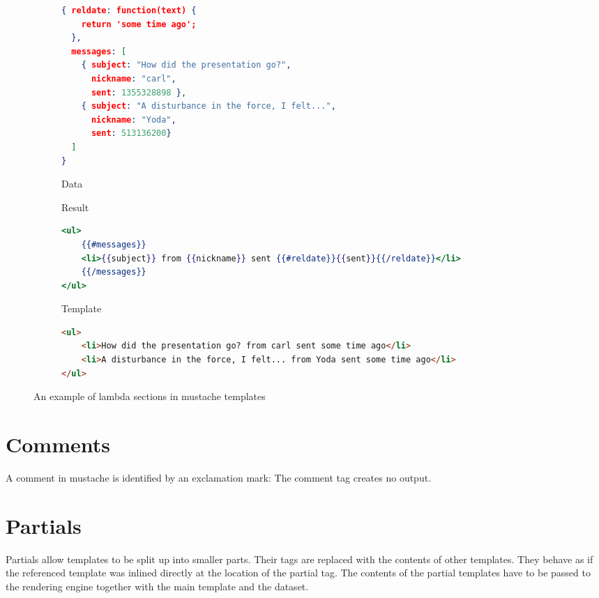 \documentclass[thesis.tex]{subfiles}
\begin{document}
\begin{figure}
	\centering
	\begin{subfigure}{\linewidth}
		\caption{Data}
		\label{fig:lambda-example.data}
		\begin{lstlisting}[language=JSON]
{ reldate: function(text) {
  	return 'some time ago';
  },
  messages: [
  	{ subject: "How did the presentation go?",
  	  nickname: "carl",
  	  sent: 1355328898 },
  	{ subject: "A disturbance in the force, I felt...",
  	  nickname: "Yoda",
  	  sent: 513136200}
  ]
}
		\end{lstlisting}
	\end{subfigure}
	
	\begin{subfigure}{\linewidth}
		\caption{Result}
		\label{fig:lambda-example.html}
		\begin{lstlisting}[language=mustache]
<ul>
	{{#messages}}
	<li>{{subject}} from {{nickname}} sent {{#reldate}}{{sent}}{{/reldate}}</li>
	{{/messages}}
</ul>
		\end{lstlisting}
		\caption{Template}
		\label{fig:lambda-example.mustache}
	\end{subfigure}
	
	\begin{subfigure}{\linewidth}
		\begin{lstlisting}[language=HTML]
<ul>
	<li>How did the presentation go? from carl sent some time ago</li>
	<li>A disturbance in the force, I felt... from Yoda sent some time ago</li>
</ul>
		\end{lstlisting}
	\end{subfigure}
	\caption{An example of lambda sections in mustache templates}
	\label{fig:lambda-example}
\end{figure}

\section{Comments}
A comment in mustache is identified by an exclamation mark:
The comment tag creates no output.

\section{Partials}
\label{sec:mustache-explain-partial}
Partials allow templates to be split up into smaller parts. Their tags are
replaced with the contents of other templates. They behave as if the referenced
template was inlined directly at the location of the partial tag.
The contents of the partial templates have to be passed to the rendering engine
together with the main template and the dataset.
\end{document}
